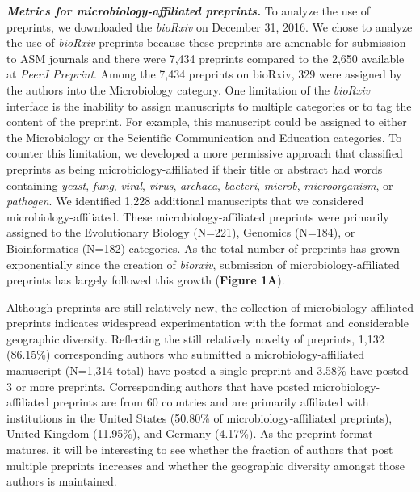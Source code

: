 \documentclass[11pt,]{article}
\begin{document}
\textbf{\emph{Metrics for microbiology-affiliated preprints.}} To
analyze the use of preprints, we downloaded the \emph{bioRxiv} on
December 31, 2016. We chose to analyze the use of \emph{bioRxiv}
preprints because these preprints are amenable for submission to ASM
journals and there were 7,434 preprints compared to the 2,650 available
at \emph{PeerJ Preprint}. Among the 7,434 preprints on bioRxiv, 329 were
assigned by the authors into the Microbiology category. One limitation
of the \emph{bioRxiv} interface is the inability to assign manuscripts
to multiple categories or to tag the content of the preprint. For
example, this manuscript could be assigned to either the Microbiology or
the Scientific Communication and Education categories. To counter this
limitation, we developed a more permissive approach that classified
preprints as being microbiology-affiliated if their title or abstract
had words containing \emph{yeast}, \emph{fung}, \emph{viral},
\emph{virus}, \emph{archaea}, \emph{bacteri}, \emph{microb},
\emph{microorganism}, or \emph{pathogen}. We identified 1,228 additional
manuscripts that we considered microbiology-affiliated. These
microbiology-affiliated preprints were primarily assigned to the
Evolutionary Biology (N=221), Genomics (N=184), or Bioinformatics
(N=182) categories. As the total number of preprints has grown
exponentially since the creation of \emph{biorxiv}, submission of
microbiology-affiliated preprints has largely followed this growth
(\textbf{Figure 1A}).

Although preprints are still relatively new, the collection of
microbiology-affiliated preprints indicates widespread experimentation
with the format and considerable geographic diversity. Reflecting the
still relatively novelty of preprints, 1,132 (86.15\%) corresponding
authors who submitted a microbiology-affiliated manuscript (N=1,314
total) have posted a single preprint and 3.58\% have posted 3 or more
preprints. Corresponding authors that have posted
microbiology-affiliated preprints are from 60 countries and are
primarily affiliated with institutions in the United States (50.80\% of
microbiology-affiliated preprints), United Kingdom (11.95\%), and
Germany (4.17\%). As the preprint format matures, it will be interesting
to see whether the fraction of authors that post multiple preprints
increases and whether the geographic diversity amongst those authors is
maintained.
\end{document}
